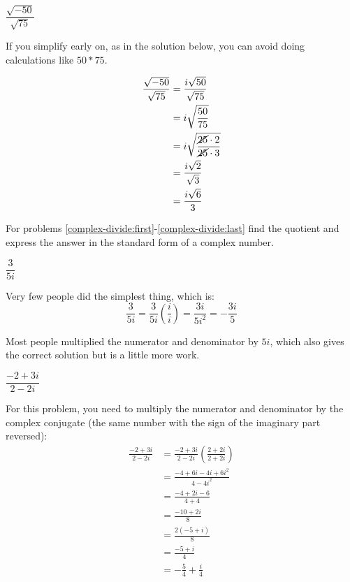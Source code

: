 \documentclass[fleqn,addpoints]{exam}
\begin{document}
\begin{questions}
\question[5] \( \dfrac{\sqrt{-50}} {\sqrt{75}} \)
\label{complex-simplify:last}
\begin{solution}[4 cm]
If you simplify early on, as in the solution below, you can avoid doing calculations like $50*75$.

\begin{align*}
  \frac{\sqrt{-50}} {\sqrt{75}} &= \frac{i \sqrt{50}} {\sqrt{75}}  \\
  &= i \sqrt{\frac{50}{75}} \\
  &= i \sqrt{ \frac{\cancel{25} \cdot 2}{\cancel{25} \cdot 3}} \\
  &= \frac{i \sqrt{2}}{\sqrt{3}} \\
  &= \frac{i \sqrt{6}}{3} \\
\end{align*}

\end{solution}

\ifprintanswers
\else
\pagebreak
\fi

For problems \ref{complex-divide:first}-\ref{complex-divide:last} find the quotient and express the answer in the
standard form of a complex number.

\question[5] \( \dfrac{3}{5i} \)
\label{complex-divide:first}
\begin{solution}[4 cm]
Very few people did the simplest thing, which is:
\[
  \frac{3}{5i} = \frac{3}{5i} \left( \frac{i}{i} \right) = \frac{3i}{5i^2} = - \frac{3i}{5}
\]

Most people multiplied the numerator and denominator by $5i$, which also gives the correct solution but is a little more work.

\end{solution}

\question[7] \( \dfrac{-2 + 3i}{2 - 2i} \)
\label{complex-divide:last}
\begin{solution}[5 cm]
For this problem, you need to multiply the numerator and denominator by the complex conjugate (the same number with the
sign of the imaginary part reversed):
\begin{align*}
  \frac{-2 + 3i}{2 - 2i} &= \frac{-2 + 3i}{2 - 2i} \left( \frac{2+2i}{2+2i} \right) \\
  &= \frac{-4 + 6i - 4i + 6i^2}{4-4i^2} \\
  &= \frac{-4 + 2i - 6}{4+4} \\
  &= \frac{-10 + 2i}{8} \\
  &= \frac{2(-5 + i)}{8} \\
  &= \frac{-5 + i}{4} \\
  &= -\frac{5}{4} + \frac{i}{4} \\
\end{align*}




\end{solution}
\end{questions}
\end{document}
